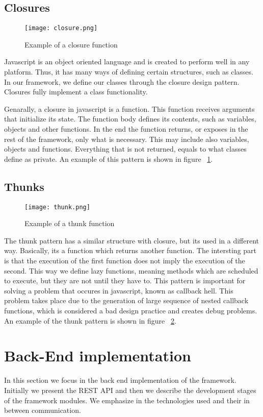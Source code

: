 \subsection{Closures}
\begin{figure}
	\texttt{[image: closure.png]}
	\caption{Example of a closure function}
	\label{closure}
\end{figure} 
Javascript is an object oriented language and is created to perform well in any platform. Thus, it has many ways of defining certain structures, such as classes. In our framework, we define our classes through the closure design pattern. Closures fully implement a class functionality.\par
	Genarally, a closure in javascript is a function. This function receives arguments that initialize its state. The function body defines its contents, such as variables, objects and other functions. In the end the function returns, or exposes in the rest of the framework, only what is necessary. This may include also variables, objects and functions. Everything that is not returned, equals to what classes define as private. An example of this pattern is shown in figure ~\ref{closure}.

\subsection{Thunks}
\begin{figure}
	\texttt{[image: thunk.png]}
	\caption{Example of a thunk function}
	\label{thunk}
\end{figure} 
The thunk pattern has a similar structure with closure, but its used in a different way. Basically, its a function which returns another function. The intersting part is that the execution of the first function does not imply the execution of the second. This way we define lazy functions, meaning methods which are scheduled to execute, but they are not until they have to. This pattern is important for solving a problem that occures in javascript, known as callback hell. This problem takes place due to the generation of large sequence of nested callback functions, which is considered a bad design practice and creates debug problems. An example of the thunk pattern is shown in figure ~\ref{thunk}.

\section{Back-End implementation}
In this section we focus in the back end implementation of the framework. Initially we present the REST API and then we describe the development stages of the framework modules. We emphasize in the technologies used and their in between communication.

